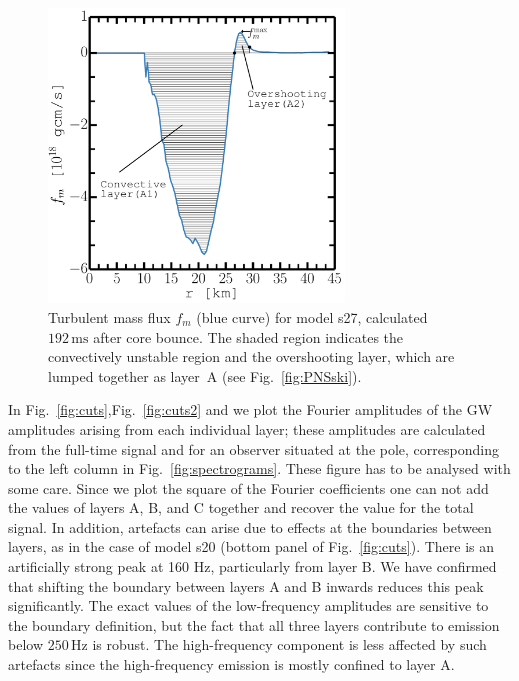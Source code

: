 \begin{figure}
\centering                                       
\includegraphics[width=0.7\textwidth]{./images/paper1/fig5.pdf}
\caption{Turbulent mass flux $f_m$ (blue curve) for model s27, calculated $192 \, \mathrm{ms}$ after core bounce.
The shaded region indicates the convectively unstable region and the overshooting layer, which
are lumped together as layer~A  (see Fig.~\ref{fig:PNSski}).
\label{fig:fm}}
\end{figure}

In Fig.~\ref{fig:cuts},Fig.~\ref{fig:cuts2} and  we plot the Fourier amplitudes of the GW
amplitudes arising from each individual layer; these amplitudes are
calculated from the full-time signal and for an observer situated at
the pole, corresponding to the left column in
Fig.~\ref{fig:spectrograms}. These figure has to be analysed with some care. Since
we plot the square of the Fourier coefficients one can not add the values of layers A, B, and C 
together and recover the value for the total signal. In addition, artefacts can arise due to
effects at the boundaries between layers, as in the case of model s20 (bottom panel of Fig.~\ref{fig:cuts}).
There is an artificially strong peak at 160 Hz, particularly from layer B. We have confirmed that shifting the 
boundary between layers A and B inwards reduces this peak significantly. The exact values of the low-frequency
amplitudes are sensitive to the boundary definition, but the fact that all three layers contribute to
emission below $250 \, \mathrm{Hz}$ is robust. The high-frequency component is less affected by such artefacts since the high-frequency emission is mostly confined to layer A.  


